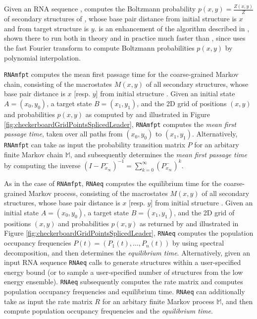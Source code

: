 Given an RNA sequence \seq,  \ffttwo computes the Boltzmann probability
$p(x,y) = \frac{Z(x,y)}{Z}$ of secondary structures of \seq, whose base
pair distance from initial structure \strA is $x$ and from target structure
\strB is $y$. \ffttwo is an enhancement of the algorithm
described in \citep{Senter.jmb14}, shown there
to run both in theory and in practice much faster than \rnatwofold
\citep{hofacker:RNAbor2D},
since \ffttwo uses the fast Fourier transform to
compute Boltzmann probabilities $p(x,y)$ by polynomial interpolation.


{\tt RNAmfpt} computes the mean first passage time for the
coarse-grained Markov chain,
consisting of the macrostates $M(x,y)$ of all secondary structures,
whose base pair distance is $x$ [resp. $y$] from initial structure .
Given an initial state $A=(x_0,y_0)$, a
target state $B=(x_1,y_1)$, and the 2D grid of positions $(x,y)$
and probabilities $p(x,y)$ as computed by \ffttwo and
illustrated in
Figure \ref{fig:checkerboardGridPointsSplicedLeader},
{\tt RNAmfpt} computes the {\em mean first passage time}, taken
over all paths from $(x_0,y_0)$ to  $(x_1,y_1)$.  Alternatively,
{\tt RNAmfpt} can take as input the probability transition matrix $P$ for
an arbitary finite Markov chain $\mathbb{M}$, and subsequently
determines the {\em mean first passage time} by computing the inverse
$(I - P^{-}_{x_{\infty}})^{-1} = \displaystyle\sum_{k=0}^{\infty}
(P^{-}_{x_{\infty}})^k$.


As in the case of {\tt RNAmfpt}, {\tt RNAeq}
computes the equilibrium time for the coarse-grained Markov process,
consisting of the macrostates $M(x,y)$ of all secondary structures,
whose base pair distance is $x$ [resp. $y$] from initial structure .
Given an initial state $A=(x_0,y_0)$, a
target state $B=(x_1,y_1)$, and the 2D grid of positions $(x,y)$
and probabilities $p(x,y)$ as returned by \ffttwo and
illustrated in
Figure \ref{fig:checkerboardGridPointsSplicedLeader},
{\tt RNAeq} computes the population occupancy frequencies
$P(t) = (P_1(t),\ldots,P_n(t))$ by using spectral decomposition, and
then determines the {\em equilibrium time}.
Alternatively, given an input RNA sequence {\tt RNAeq}
calls \rnasub \citep{wuchtyFontanaHofackerSchuster} to generate
structures within a user-specified energy bound (or to sample a user-specified
number of structures from the low energy ensemble). {\tt RNAeq} subsequently
computes the rate matrix and computes population occupancy frequencies
and equilibrium time. {\tt RNAeq} can additionally
take as input the rate matrix $R$ for
an arbitary finite Markov process $\mathbb{M}$, and then
compute population occupancy frequencies
and the {\em equilibrium time}.

